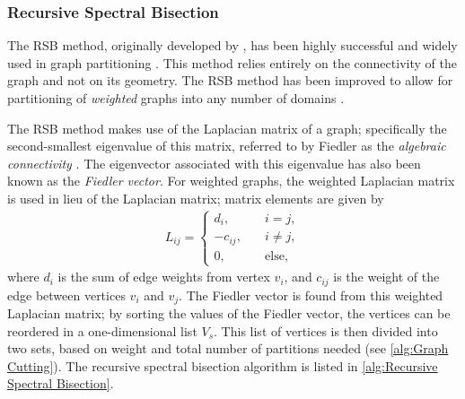 {{{      \subsubsection{Recursive Spectral Bisection}{\label{sssec:Spatial Decomposition:Recursive Spectral Bisection}
        The \ac{RSB} method, originally developed by \citet{Pothen1989}, has been highly successful and widely used in graph partitioning \cite{Simon1991,Spielman2007}.
        This method relies entirely on the connectivity of the graph and not on its geometry.
        The \ac{RSB} method has been improved to allow for partitioning of \emph{weighted} graphs into any number of domains \cite{Hsieh1995}.

        The \ac{RSB} method makes use of the Laplacian matrix of a graph; specifically the second-smallest eigenvalue of this matrix, referred to by Fiedler as the \emph{algebraic connectivity} \cite{Fiedler1973}.
        The eigenvector associated with this eigenvalue has also been known as the \emph{Fiedler vector}.
        For weighted graphs, the weighted Laplacian matrix is used in lieu of the Laplacian matrix; matrix elements are given by
        \begin{align}
          \label{eq:Spatial Decomposition:Weighted Laplacian}
          L_{ij} =
            \begin{cases}
              d_i, \quad&{i=j},\\
              -c_{ij}, \quad&{i\neq j},\\
              0, \quad&{\text{else}},
            \end{cases}
        \end{align}
        where $d_i$ is the sum of edge weights from vertex $v_i$, and $c_{ij}$ is the weight of the edge between vertices $v_i$ and $v_j$.
        The Fiedler vector is found from this weighted Laplacian matrix; by sorting the values of the Fiedler vector, the vertices can be reordered in a one-dimensional list $V_s$.
        This list of vertices is then divided into two sets, based on weight and total number of partitions needed (see \cref{alg:Graph Cutting}).
        The recursive spectral bisection algorithm is listed in \cref{alg:Recursive Spectral Bisection}.

}}}}
